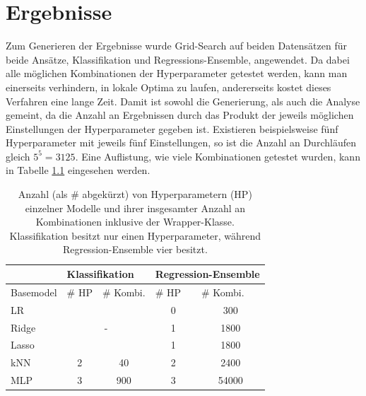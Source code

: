 \chapter{Ergebnisse}

Zum Generieren der Ergebnisse wurde Grid-Search auf beiden Datensätzen für beide Ansätze, Klassifikation und
 Regressions-Ensemble, angewendet. Da dabei alle möglichen Kombinationen der Hyperparameter getestet werden,
 kann man einerseits verhindern, in lokale Optima zu laufen, andererseits kostet dieses Verfahren eine lange
 Zeit. Damit ist sowohl die Generierung, als auch die Analyse gemeint, da die Anzahl an Ergebnissen durch das
 Produkt der jeweils möglichen Einstellungen der Hyperparameter gegeben ist. Existieren beispielsweise fünf
 Hyperparameter mit jeweils fünf Einstellungen, so ist die Anzahl an Durchläufen gleich $5^5=3125$.
 Eine Auflistung, wie viele Kombinationen getestet wurden, kann in Tabelle \ref{tab:res-kombs} eingesehen werden.

 \begin{table}[ht]
    \centering
    \begin{tabular}{l|ll|ll}
    & \multicolumn{2}{l|}{Klassifikation} & \multicolumn{2}{l}{Regression-Ensemble} \\
    \hline
    Basemodel & \# HP & \# Kombi. & \# HP & \# Kombi. \\
    \hline
    LR        &                           &                                & \multicolumn{1}{c}{0}     & \multicolumn{1}{c}{300}       \\
    Ridge     &                           \multicolumn{2}{c|}{-}           & \multicolumn{1}{c}{1}     & \multicolumn{1}{c}{1800}      \\
    Lasso     &                           &                                & \multicolumn{1}{c}{1}     & \multicolumn{1}{c}{1800}      \\
    kNN       & \multicolumn{1}{c}{2}     & \multicolumn{1}{c|}{40}        & \multicolumn{1}{c}{2}     & \multicolumn{1}{c}{2400}      \\
    MLP       & \multicolumn{1}{c}{3}     & \multicolumn{1}{c|}{900}       & \multicolumn{1}{c}{3}     & \multicolumn{1}{c}{54000}
    \end{tabular}
    \caption{Anzahl (als \# abgekürzt) von Hyperparametern (HP) einzelner Modelle und ihrer insgesamter Anzahl an
        Kombinationen inklusive der Wrapper-Klasse. Klassifikation besitzt nur einen Hyperparameter, während
        Regression-Ensemble vier besitzt.}
    \label{tab:res-kombs}
\end{table}


